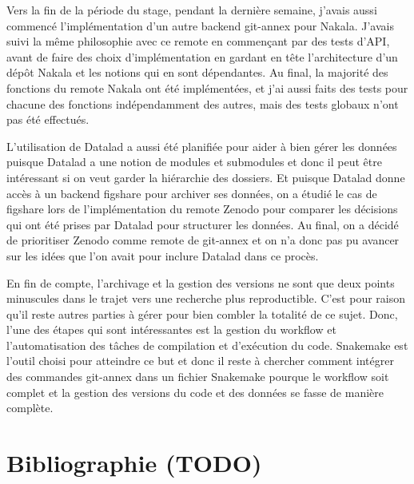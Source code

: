 \documentclass[11pt]{article}
\begin{document}
Vers la fin de la période du stage, pendant la dernière semaine,
j'avais aussi commencé l'implémentation d'un autre backend git-annex
pour Nakala. J'avais suivi la même philosophie avec ce remote en
commençant par des tests d'API, avant de faire des choix
d'implémentation en gardant en tête l'architecture d'un dépôt Nakala
et les notions qui en sont dépendantes. Au final, la majorité des
fonctions du remote Nakala ont été implémentées, et j'ai aussi faits
des tests pour chacune des fonctions indépendamment des autres, mais
des tests globaux n'ont pas été effectués.

L'utilisation de Datalad a aussi été planifiée pour aider à bien gérer
les données puisque Datalad a une notion de modules et submodules et
donc il peut être intéressant si on veut garder la hiérarchie des
dossiers. Et puisque Datalad donne accès à un backend figshare pour
archiver ses données, on a étudié le cas de figshare lors de
l'implémentation du remote Zenodo pour comparer les décisions qui ont
été prises par Datalad pour structurer les données. Au final, on a
décidé de prioritiser Zenodo comme remote de git-annex et on n'a donc
pas pu avancer sur les idées que l'on avait pour inclure Datalad dans
ce procès.

En fin de compte, l'archivage et la gestion des versions ne sont que
deux points minuscules dans le trajet vers une recherche plus
reproductible. C'est pour raison qu'il reste autres parties à gérer
pour bien combler la totalité de ce sujet. Donc, l'une des étapes qui
sont intéressantes est la gestion du workflow et l'automatisation des
tâches de compilation et d'exécution du code. Snakemake est l'outil
choisi pour atteindre ce but et donc il reste à chercher comment
intégrer des commandes git-annex dans un fichier Snakemake pourque le
workflow soit complet et la gestion des versions du code et des
données se fasse de manière complète.

\section{Bibliographie (TODO)}
\label{sec:orga5503d8}
\end{document}
